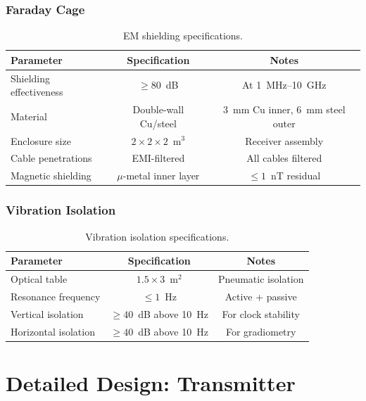 \documentclass[11pt,onecolumn]{article}
\begin{document}
\subsubsection{Faraday Cage}

\begin{table}[H]
\centering
\caption{EM shielding specifications.}
\label{tab:shielding}
\begin{tabular}{lcc}
\toprule
Parameter & Specification & Notes \\
\midrule
Shielding effectiveness & $\geq 80$~dB & At 1~MHz--10~GHz \\
Material & Double-wall Cu/steel & 3~mm Cu inner, 6~mm steel outer \\
Enclosure size & $2 \times 2 \times 2$~m$^3$ & Receiver assembly \\
Cable penetrations & EMI-filtered & All cables filtered \\
Magnetic shielding & $\mu$-metal inner layer & $\leq 1$~nT residual \\
\bottomrule
\end{tabular}
\end{table}

\subsubsection{Vibration Isolation}

\begin{table}[H]
\centering
\caption{Vibration isolation specifications.}
\label{tab:vibration}
\begin{tabular}{lcc}
\toprule
Parameter & Specification & Notes \\
\midrule
Optical table & $1.5 \times 3$~m$^2$ & Pneumatic isolation \\
Resonance frequency & $\leq 1$~Hz & Active + passive \\
Vertical isolation & $\geq 40$~dB above 10~Hz & For clock stability \\
Horizontal isolation & $\geq 40$~dB above 10~Hz & For gradiometry \\
\bottomrule
\end{tabular}
\end{table}

\section{Detailed Design: Transmitter}
\end{document}
